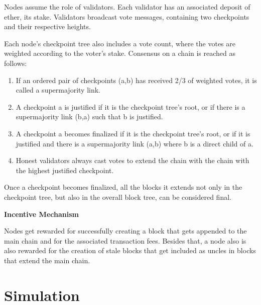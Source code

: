 Nodes assume the role of validators. Each validator has an associated deposit of ether, its stake. Validators broadcast vote messages, containing two checkpoints and their respective heights.

Each node’s checkpoint tree also includes a vote count, where the votes are weighted according to the voter’s stake. Consensus on a chain is reached as follows:

\begin{enumerate}
  \item If an ordered pair of checkpoints (a,b) has received 2/3 of weighted votes, it is called a supermajority link.
  \item A checkpoint a is justified if it is the checkpoint tree’s root, or if there is a supermajority link (b,a) such that b is justified.
  \item A checkpoint a becomes finalized if it is the checkpoint tree’s root, or if it is justified and there is a supermajority link (a,b) where b is a direct child of a.
  \item Honest validators always cast votes to extend the chain with the chain with the highest justified checkpoint.
\end{enumerate}

Once a checkpoint becomes finalized, all the blocks it extends not only in the checkpoint tree, but also in the overall block tree, can be considered final.

\vspace{0.25cm}

\textbf{Incentive Mechanism}

Nodes get rewarded for successfully creating a block that gets appended to the main chain and for the associated transaction fees. Besides that, a node also is also rewarded for the creation of stale blocks that get included as uncles in blocks that extend the main chain.






\section{Simulation}

